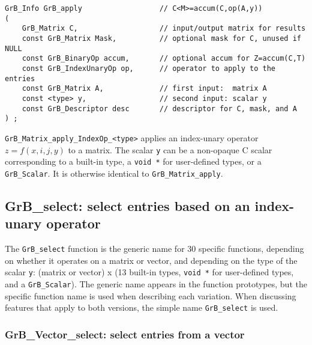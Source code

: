 \documentclass[12pt]{article}
\begin{document}
\begin{mdframed}[userdefinedwidth=6in]
{\footnotesize
\begin{verbatim}
GrB_Info GrB_apply                  // C<M>=accum(C,op(A,y))
(
    GrB_Matrix C,                   // input/output matrix for results
    const GrB_Matrix Mask,          // optional mask for C, unused if NULL
    const GrB_BinaryOp accum,       // optional accum for Z=accum(C,T)
    const GrB_IndexUnaryOp op,      // operator to apply to the entries
    const GrB_Matrix A,             // first input:  matrix A
    const <type> y,                 // second input: scalar y
    const GrB_Descriptor desc       // descriptor for C, mask, and A
) ;
\end{verbatim} } \end{mdframed}

\verb'GrB_Matrix_apply_IndexOp_<type>'  applies an index-unary operator
$z=f(x,i,j,y)$ to a matrix.
The scalar \verb'y' can be a non-opaque C scalar corresponding to a built-in
type, a \verb'void *' for user-defined types, or a \verb'GrB_Scalar'.
It is otherwise identical to \verb'GrB_Matrix_apply'.

\newpage
\subsection{{\sf GrB\_select:} select entries based on an index-unary operator}
\label{select}

The \verb'GrB_select' function is the generic name for 30 specific functions,
depending on whether it operates on a matrix or vector, and depending on the
type of the scalar \verb'y': (matrix or vector) x (13 built-in types,
\verb'void *' for user-defined types, and a \verb'GrB_Scalar').  The generic
name appears in the function prototypes, but the specific function name is used
when describing each variation.  When discussing features that apply to both
versions, the simple name \verb'GrB_select' is used.

\subsubsection{{\sf GrB\_Vector\_select:} select entries from a vector}
\label{select_vector}
\end{document}
